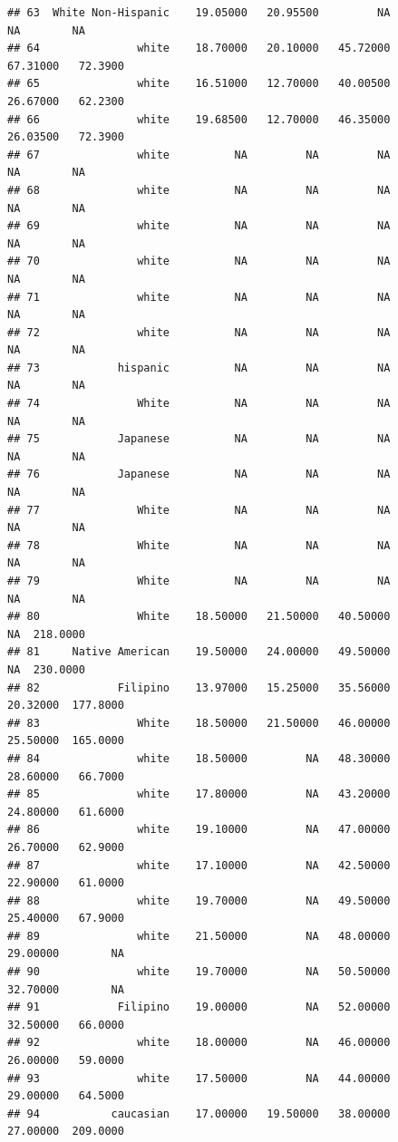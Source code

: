 \documentclass[]{article}
\begin{document}
\begin{verbatim}
## 63  White Non-Hispanic    19.05000   20.95500         NA           NA        NA
## 64               white    18.70000   20.10000   45.72000     67.31000   72.3900
## 65               white    16.51000   12.70000   40.00500     26.67000   62.2300
## 66               white    19.68500   12.70000   46.35000     26.03500   72.3900
## 67               white          NA         NA         NA           NA        NA
## 68               white          NA         NA         NA           NA        NA
## 69               white          NA         NA         NA           NA        NA
## 70               white          NA         NA         NA           NA        NA
## 71               white          NA         NA         NA           NA        NA
## 72               white          NA         NA         NA           NA        NA
## 73            hispanic          NA         NA         NA           NA        NA
## 74               White          NA         NA         NA           NA        NA
## 75            Japanese          NA         NA         NA           NA        NA
## 76            Japanese          NA         NA         NA           NA        NA
## 77               White          NA         NA         NA           NA        NA
## 78               White          NA         NA         NA           NA        NA
## 79               White          NA         NA         NA           NA        NA
## 80               White    18.50000   21.50000   40.50000           NA  218.0000
## 81     Native American    19.50000   24.00000   49.50000           NA  230.0000
## 82            Filipino    13.97000   15.25000   35.56000     20.32000  177.8000
## 83               White    18.50000   21.50000   46.00000     25.50000  165.0000
## 84               white    18.50000         NA   48.30000     28.60000   66.7000
## 85               white    17.80000         NA   43.20000     24.80000   61.6000
## 86               white    19.10000         NA   47.00000     26.70000   62.9000
## 87               white    17.10000         NA   42.50000     22.90000   61.0000
## 88               white    19.70000         NA   49.50000     25.40000   67.9000
## 89               white    21.50000         NA   48.00000     29.00000        NA
## 90               white    19.70000         NA   50.50000     32.70000        NA
## 91            Filipino    19.00000         NA   52.00000     32.50000   66.0000
## 92               white    18.00000         NA   46.00000     26.00000   59.0000
## 93               white    17.50000         NA   44.00000     29.00000   64.5000
## 94           caucasian    17.00000   19.50000   38.00000     27.00000  209.0000

\end{verbatim}
\end{document}
